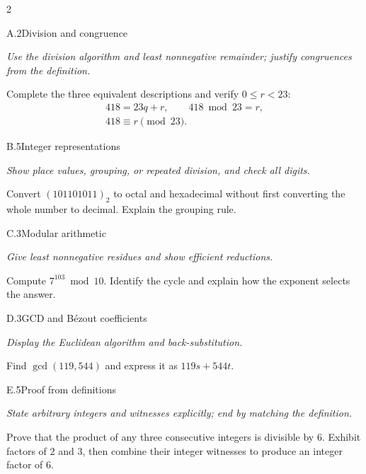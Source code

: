 \documentclass[9pt]{extarticle}
\begin{document}
\begin{multicols}{2}
\begin{CoreProblem}{A.2}{Division and congruence}
{\scriptsize\textit{Use the division algorithm and least nonnegative remainder; justify congruences from the definition.}\par}
Complete the three equivalent descriptions and verify $0\le r<23$:
\[
\begin{gathered}
418=23q+r,\qquad 418\bmod 23=r,\\
418\equiv r\pmod{23}.
\end{gathered}
\]
\end{CoreProblem}
\begin{CoreProblem}{B.5}{Integer representations}
{\scriptsize\textit{Show place values, grouping, or repeated division, and check all digits.}\par}
Convert $(101101011)_2$ to octal and hexadecimal without first converting the
whole number to decimal. Explain the grouping rule.
\end{CoreProblem}
\begin{CoreProblem}{C.3}{Modular arithmetic}
{\scriptsize\textit{Give least nonnegative residues and show efficient reductions.}\par}
Compute $7^{103}\bmod10$. Identify the cycle and explain how the exponent
selects the answer.
\end{CoreProblem}
\columnbreak
\begin{CoreProblem}{D.3}{GCD and B\'ezout coefficients}
{\scriptsize\textit{Display the Euclidean algorithm and back-substitution.}\par}
Find $\gcd(119,544)$ and express it as $119s+544t$.
\end{CoreProblem}
\begin{CoreProblem}{E.5}{Proof from definitions}
{\scriptsize\textit{State arbitrary integers and witnesses explicitly; end by matching the definition.}\par}
Prove that the product of any three consecutive integers is divisible by $6$.
Exhibit factors of $2$ and $3$, then combine their integer witnesses to
produce an integer factor of $6$.
\end{CoreProblem}
\end{multicols}
\CoreWorkArea
\FormBreak
{}
\end{document}
